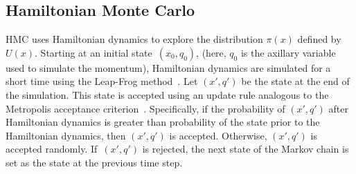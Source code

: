 \documentclass[letterpaper, 10 pt, conference]{ieeeconf}  %
\begin{document}
\subsection{Hamiltonian Monte Carlo}
HMC uses Hamiltonian dynamics to explore the distribution $\pi(x)$ defined by $U(x)$. 
Starting at an initial state~$(x_0, q_0)$, 
(here, $q_0$ is the axillary variable used to simulate the momentum), Hamiltonian dynamics are simulated for a short time using the Leap-Frog method~\cite{S82}. 
Let $(x', q')$ be the state at the end of the simulation. 
This state is accepted using an update rule analogous to the Metropolis acceptance criterion~\cite{CG95}. 
Specifically, if the probability of $(x', q')$ after Hamiltonian dynamics is greater than probability of the state prior to the Hamiltonian dynamics, then $(x', q')$ is accepted.
Otherwise, $(x', q')$ is accepted randomly. 
If~$(x', q')$ is rejected, the next state of the Markov chain is set as the state at the previous time step. 
\end{document}
